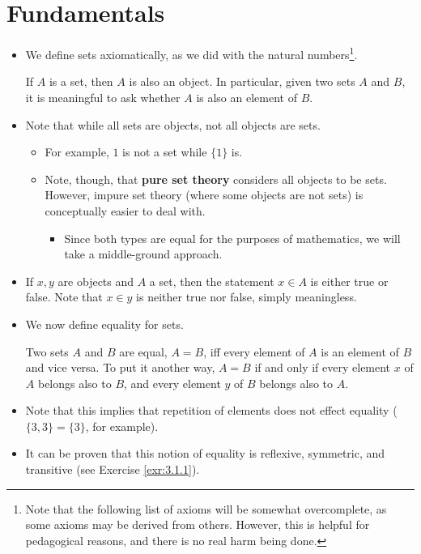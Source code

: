 \documentclass[../main.tex]{subfiles}
\begin{document}
\section{Fundamentals}\label{sse:3.1}
\begin{itemize}
    \item We define sets axiomatically, as we did with the natural numbers\footnote{Note that the following list of axioms will be somewhat overcomplete, as some axioms may be derived from others. However, this is helpful for pedagogical reasons, and there is no real harm being done.}.
    \begin{axm}\label{axm:setsAreObjects}
        If $A$ is a set, then $A$ is also an object. In particular, given two sets $A$ and $B$, it is meaningful to ask whether $A$ is also an element of $B$.
    \end{axm}
    \item Note that while all sets are objects, not all objects are sets.
    \begin{itemize}
        \item For example, $1$ is not a set while $\{1\}$ is.
        \item Note, though, that \textbf{pure set theory} considers all objects to be sets. However, impure set theory (where some objects are not sets) is conceptually easier to deal with.
        \begin{itemize}
            \item Since both types are equal for the purposes of mathematics, we will take a middle-ground approach.
        \end{itemize}
    \end{itemize}
    \item If $x,y$ are objects and $A$ a set, then the statement $x\in A$ is either true or false. Note that $x\in y$ is neither true nor false, simply meaningless.
    \item We now define equality for sets.
    \begin{dfn}\label{dfn:setEquality}
        Two sets $A$ and $B$ are equal, $A=B$, iff every element of $A$ is an element of $B$ and vice versa. To put it another way, $A=B$ if and only if every element $x$ of $A$ belongs also to $B$, and every element $y$ of $B$ belongs also to $A$.
    \end{dfn}
    \item Note that this implies that repetition of elements does not effect equality ($\{3,3\}=\{3\}$, for example).
    \item It can be proven that this notion of equality is reflexive, symmetric, and transitive (see Exercise \ref{exr:3.1.1}).

\end{itemize}
\end{document}
